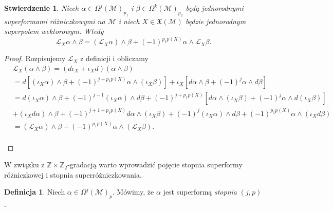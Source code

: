 \documentclass[11pt,a4paper]{report}
\newtheorem{proposition}[theorem]{Stwierdzenie}
\theoremstyle{definition}
\newtheorem{definition}[theorem]{Definicja}
\begin{document}
\begin{proposition}
	\label{prop:superlie}
	Niech $\alpha \in \Omega^j (\mathcal{M})_{p_1}\!$ i $\beta\in \Omega^k (\mathcal{M})_{p_2}$ będą jednorodnymi superformami różniczkowymi na $\mathcal{M}$ i niech $X \in \mathfrak{X}(\mathcal{M})$ będzie jednorodnym superpolem wektorowym. Wtedy
	\begin{equation*}
		\mathcal{L}_X\alpha\wedge\beta=(\mathcal{L}_X\alpha)\wedge\beta+(-1)^{p_1 p(X)} \alpha\wedge\mathcal{L}_X\beta.
	\end{equation*}
\end{proposition}
			      				
\begin{proof}
	Rozpisujemy $\mathcal L_X$ z definicji i obliczamy
	\begin{equation*}
		\begin{aligned}
			  & \mathcal{L}_X (\alpha\wedge \beta) =(d\iota_X+\iota_Xd)(\alpha\wedge \beta)                                                                                                \\
			  & =d[(\iota_X\alpha)\wedge \beta+(-1)^{j+p_1p(X)}\alpha\wedge (\iota_X\beta)]+\iota_X[d\alpha \wedge \beta+(-1)^{j}\alpha\wedge d\beta]                                      \\
			  & =d(\iota_X \alpha) \wedge \beta+(-1)^{j-1}(\iota_X\alpha)\wedge d\beta                                                                                                     
			+(-1)^{j+p_1 p(X)}[d\alpha\wedge (\iota_X\beta)+(-1)^{j}\alpha\wedge d(\iota_X\beta)] \\
			  & +(\iota_X d\alpha) \wedge \beta + (-1)^{j+1+p_1 p(X)} d\alpha \wedge (\iota_X\beta) +(-1)^j (\iota_X\alpha) \wedge d\beta + (-1)^{p_1 p(X)} \alpha \wedge (\iota_X d\beta) \\
			  & =(\mathcal{L}_X\alpha)\wedge\beta+(-1)^{p_1 p(X)}\alpha\wedge (\mathcal{L}_X\beta).                                                                                        
		\end{aligned}
	\end{equation*} \\[-27pt]
\end{proof}
			      				
W związku z $\mathbb{Z}\times \mathbb{Z}_2$-gradacją warto wprowadzić pojęcie stopnia superformy różniczkowej i stopnia superróżniczkowania.
			      				
\begin{definition}
	Niech $\alpha \in \Omega^j (\mathcal{M})_{p}$. Mówimy, że $\alpha$ jest superformą \textit{stopnia} $(j,p)$.
\end{definition}
			      				
\end{document}
